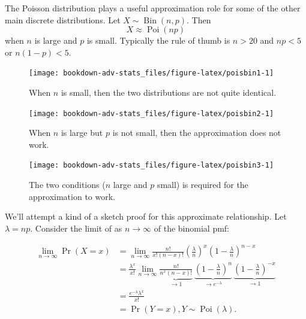 \documentclass[
]{book}
\DeclareMathOperator{\Bin}{Bin}
\DeclareMathOperator{\Pois}{Poi}
\theoremstyle{definition}
\theoremstyle{definition}
\theoremstyle{definition}
\theoremstyle{definition}
\theoremstyle{remark}
\begin{document}
The Poisson distribution plays a useful approximation role for some of the other main discrete distributions.
Let \(X\sim\Bin(n,p)\).
Then
\[
X \approx \Pois(np)
\]
when \(n\) is large and \(p\) is small.
Typically the rule of thumb is \(n>20\) and \(np<5\) or \(n(1-p)<5\).

\begin{figure}

{\centering \texttt{[image: bookdown-adv-stats\_files/figure-latex/poisbin1-1]} 

}

\caption{When \(n\) is small, then the two distributions are not quite identical.}\label{fig:poisbin1}
\end{figure}

\begin{figure}

{\centering \texttt{[image: bookdown-adv-stats\_files/figure-latex/poisbin2-1]} 

}

\caption{When \(n\) is large but \(p\) is not small, then the approximation does not work.}\label{fig:poisbin2}
\end{figure}

\begin{figure}

{\centering \texttt{[image: bookdown-adv-stats\_files/figure-latex/poisbin3-1]} 

}

\caption{The two conditions (\(n\) large and \(p\) small) is required for the approximation to work.}\label{fig:poisbin3}
\end{figure}

We'll attempt a kind of a sketch proof for this approximate relationship.
Let \(\lambda=np\). Consider the limit of as \(n\to\infty\) of the binomial pmf:

\begin{align*}
\lim_{n\to\infty} \Pr(X=x) 
&= \lim_{n\to\infty} \frac{n!}{x!(n-x)!}\left(\frac{\lambda}{n} \right)^x \left(1 - \frac{\lambda}{n} \right)^{n-x} \\
&= \frac{\lambda^x}{x!} \lim_{n\to\infty} 
\underbrace{\frac{n!}{n^x(n-x)!}}_{\to 1}
\,
\underbrace{\left(1 - \frac{\lambda}{n} \right)^n}_{\to e^{-\lambda}}
\,
\underbrace{\left(1 - \frac{\lambda}{n} \right)^{-x}}_{\to 1} \\
&=  \frac{e^{-\lambda}\lambda^x}{x!} \\
&= \Pr(Y=x), Y\sim\Pois(\lambda).
\end{align*}
\end{document}
